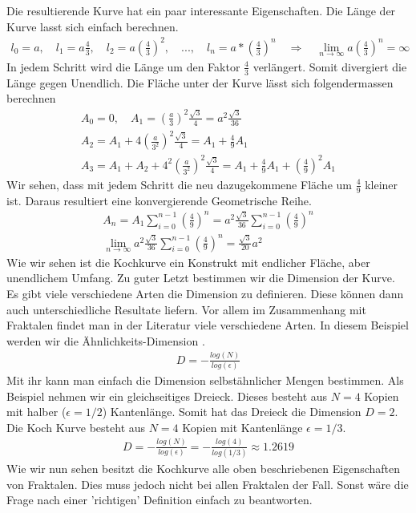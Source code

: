 Die resultierende Kurve hat ein paar interessante Eigenschaften.
Die Länge der Kurve lasst sich einfach berechnen.
\begin{align*}
	l_0 = a ,\quad l_1 = a  \frac{4}{3} ,\quad l_2 = a  \left( \frac{4}{3}\right)^2 , \quad ... , \quad
	l_n = a * \left( \frac{4}{3}\right)^n \quad
	\Rightarrow \quad
	\lim_{n\to\infty} a  \left( \frac{4}{3}\right)^n = \infty
\end{align*}
In jedem Schritt wird die Länge um den Faktor $\frac{4}{3}$ verlängert. Somit divergiert die Länge gegen Unendlich. 
Die Fläche unter der Kurve lässt sich folgendermassen berechnen
\begin{align*}
	A_0 = 0 , \quad A_1 = \left( \frac{a}{3}\right)^2 \frac{\sqrt{3}}{4} = a^2 \frac{\sqrt{3}}{36}\\
	A_2 = A_1 + 4\left( \frac{a}{3^2}\right)^2 \frac{\sqrt{3}}{4} = A_1 + \frac{4}{9} A_1 \\ 
	A_3 = A_1 + A_2 + 4^2 \left( \frac{a}{3^2}\right)^2 \frac{\sqrt{3}}{4} = A_1 + \frac{4}{9} A_1 + \left( \frac{4}{9}\right)^2 A_1	 
\end{align*}
Wir sehen, dass mit jedem Schritt die neu dazugekommene Fläche um $\frac{4}{9}$ kleiner ist.
Daraus resultiert eine konvergierende Geometrische Reihe.
\begin{align*}
	A_n = A_1 \sum_{i = 0}^{n-1} \left( \frac{4}{9}\right)^n =  a^2 \frac{\sqrt{3}}{36} \sum_{i = 0}^{n-1} \left( \frac{4}{9}\right)^n \\
	\lim_{n\to\infty} a^2 \frac{\sqrt{3}}{36} \sum_{i = 0}^{n-1} \left( \frac{4}{9}\right)^n = \frac{\sqrt{3}}{20} a^2
\end{align*}
Wie wir sehen ist die Kochkurve ein Konstrukt mit endlicher Fläche, aber unendlichem Umfang.
Zu guter Letzt bestimmen wir die Dimension der Kurve. 
Es gibt viele verschiedene Arten die Dimension zu definieren. Diese können dann auch unterschiedliche Resultate liefern.
Vor allem im Zusammenhang mit Fraktalen findet man in der Literatur viele verschiedene Arten.
In diesem Beispiel werden wir die Ähnlichkeits-Dimension \cite{ifs:fractal-geometry}.
\begin{align*}
	D = - \frac{log(N)}{log(\epsilon)}
\end{align*}
Mit ihr kann man einfach die Dimension selbstähnlicher Mengen bestimmen.
Als Beispiel nehmen wir ein gleichseitiges Dreieck. Dieses besteht aus $N = 4$ Kopien mit halber ($\epsilon = 1/2$) Kantenlänge.
Somit hat das Dreieck die Dimension $D = 2$.
Die Koch Kurve besteht aus $N = 4$ Kopien mit Kantenlänge $\epsilon = 1/3$.
\begin{align*}
	D = - \frac{log(N)}{log(\epsilon)} = - \frac{log(4)}{log(1/3)} \approx 1.2619
\end{align*}
Wie wir nun sehen besitzt die Kochkurve alle oben beschriebenen Eigenschaften von Fraktalen. 
Dies muss jedoch nicht bei allen Fraktalen der Fall. Sonst wäre die Frage nach einer 'richtigen' Definition einfach zu beantworten.


